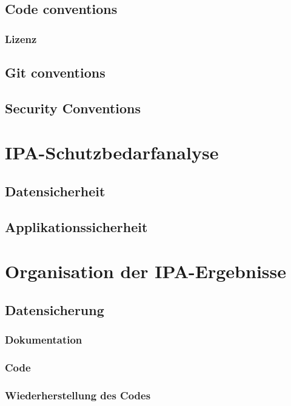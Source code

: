 \section{Code conventions}

\subsection{Lizenz}

\section{Git conventions}

\section{Security Conventions}

\chapter{IPA-Schutzbedarfanalyse}

\section{Datensicherheit}

\section{Applikationssicherheit}

\chapter{Organisation der IPA-Ergebnisse}

\section{Datensicherung}

\subsection{Dokumentation}

\subsection{Code}

\subsection{Wiederherstellung des Codes}

